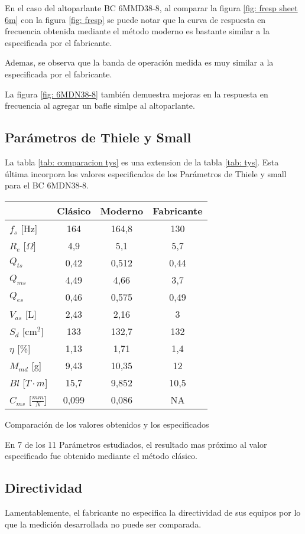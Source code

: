 \documentclass[]{article}
\makeatletter
\newcommand{\tabla}[4]{
\vspace{0.3 cm}
\begin{tablehere}
\begin{center}
\begin{tabular}{#1}
#2
\end{tabular}
\caption{#3}
\label{#4}
\end{center}
\end{tablehere}
\vspace{0.3 cm}
}
\newenvironment{tablehere}    %
  {\def\@captype{table}}    %

  {}              %
\makeatother
\begin{document}
\begin{multicols}{2}
En el caso del altoparlante BC 6MMD38-8, al comparar la figura
\ref{fig: fresp sheet 6m} con la figura \ref{fig: fresp}
se puede notar que la curva de respuesta en frecuencia obtenida mediante el método moderno
es bastante similar a la especificada por el fabricante.

Ademas, se observa que la banda de operación medida es muy similar a la especificada
por el fabricante.

La figura \ref{fig: 6MDN38-8} también demuestra mejoras en la respuesta en frecuencia
al agregar un bafle simlpe al altoparlante.


\subsection{Parámetros de Thiele y Small}
La tabla \ref{tab: comparacion tys} es una extension de la tabla \ref{tab: tys}.
Esta última incorpora los valores especificados de los Parámetros de Thiele y small
para el BC 6MDN38-8.

\tabla
{|l|c|c|c|}
{
\hline
 & Clásico & Moderno & Fabricante\\
\hline
$f_s$ [Hz] & 164 & 164,8 & 130 \\
\hline
$R_e$ [$\Omega$] & 4,9 & 5,1 & 5,7  \\
\hline
$Q_{ts}$  & 0,42 & 0,512 & 0,44 \\
\hline
$Q_{ms}$  & 4,49 & 4,66 & 3,7 \\
\hline
$Q_{es}$    & 0,46 & 0,575 & 0,49 \\
\hline
$V_{as}$ [L] & 2,43 & 2,16 & 3 \\
\hline
$S_d$ [cm$^2$] & 133 & 132,7 & 132 \\
\hline
$\eta$ [\%{}] & 1,13 & 1,71 & 1,4 \\
\hline
$M_{md}$ [g] & 9,43 & 10,35 & 12\\
\hline
$Bl$ [$T \cdot m$] & 15,7 & 9,852 & 10,5\\
\hline
$C_{ms}$ [$\frac{mm}{N}$] & 0,099 & 0,086 & NA \\
\hline
}
{Comparación de los valores obtenidos y los especificados}
{tab: comparacion tys}

En 7 de los 11 Parámetros estudiados, el resultado mas próximo al valor especificado
fue obtenido mediante el método clásico.

\subsection{Directividad}
Lamentablemente, el fabricante no especifica la directividad de sus equipos
por lo que la medición desarrollada no puede ser comparada.





\end{multicols}
\end{document}
